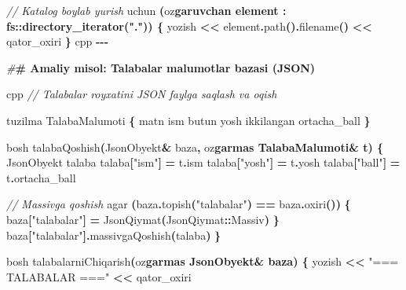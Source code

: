 \documentclass[a4paper,11pt,twoside,openright]{book}
\newenvironment{Shaded}{\begin{snugshade}}{\end{snugshade}}
\newcommand{\CharTok}[1]{\textcolor[rgb]{0.31,0.60,0.02}{#1}}
\newcommand{\CommentTok}[1]{\textcolor[rgb]{0.56,0.35,0.01}{\textit{#1}}}
\newcommand{\ErrorTok}[1]{\textcolor[rgb]{0.64,0.00,0.00}{\textbf{#1}}}
\newcommand{\NormalTok}[1]{#1}
\newcommand{\OperatorTok}[1]{\textcolor[rgb]{0.81,0.36,0.00}{\textbf{#1}}}
\newcommand{\PreprocessorTok}[1]{\textcolor[rgb]{0.56,0.35,0.01}{\textit{#1}}}
\newcommand{\StringTok}[1]{\textcolor[rgb]{0.31,0.60,0.02}{#1}}
\begin{document}
\begin{Shaded}
\begin{Highlighting}[]
\CommentTok{// Katalog bo\textquotesingle{}ylab yurish}
\NormalTok{uchun }\OperatorTok{(}\NormalTok{o}\CharTok{\textquotesingle{}z}\ErrorTok{garuvchan element : fs::directory\_iterator(".")) \{}
\NormalTok{    yozish }\OperatorTok{\textless{}\textless{}}\NormalTok{ element}\OperatorTok{.}\NormalTok{path}\OperatorTok{().}\NormalTok{filename}\OperatorTok{()} \OperatorTok{\textless{}\textless{}}\NormalTok{ qator\_oxiri}
\OperatorTok{\}}
\ErrorTok{\textasciigrave{}\textasciigrave{}\textasciigrave{}}\NormalTok{cpp}
\OperatorTok{{-}{-}{-}}

\PreprocessorTok{\#}\ErrorTok{\# Amaliy misol: Talabalar ma\textquotesingle{}lumotlar bazasi (JSON)}

\ErrorTok{\textasciigrave{}\textasciigrave{}\textasciigrave{}}\NormalTok{cpp}
\CommentTok{// Talabalar ro\textquotesingle{}yxatini JSON faylga saqlash va o\textquotesingle{}qish}

\NormalTok{tuzilma TalabaMalumoti }\OperatorTok{\{}
\NormalTok{    matn ism}
\NormalTok{    butun yosh}
\NormalTok{    ikkilangan ortacha\_ball}
\OperatorTok{\}}

\NormalTok{bosh talabaQoshish}\OperatorTok{(}\NormalTok{JsonObyekt}\OperatorTok{\&}\NormalTok{ baza}\OperatorTok{,}\NormalTok{ o}\CharTok{\textquotesingle{}z}\ErrorTok{garmas TalabaMalumoti\& t) \{}
\NormalTok{    JsonObyekt talaba}
\NormalTok{    talaba}\OperatorTok{[}\StringTok{"ism"}\OperatorTok{]} \OperatorTok{=}\NormalTok{ t}\OperatorTok{.}\NormalTok{ism}
\NormalTok{    talaba}\OperatorTok{[}\StringTok{"yosh"}\OperatorTok{]} \OperatorTok{=}\NormalTok{ t}\OperatorTok{.}\NormalTok{yosh}
\NormalTok{    talaba}\OperatorTok{[}\StringTok{"ball"}\OperatorTok{]} \OperatorTok{=}\NormalTok{ t}\OperatorTok{.}\NormalTok{ortacha\_ball}

    \CommentTok{// Massivga qo\textquotesingle{}shish}
\NormalTok{    agar }\OperatorTok{(}\NormalTok{baza}\OperatorTok{.}\NormalTok{topish}\OperatorTok{(}\StringTok{"talabalar"}\OperatorTok{)} \OperatorTok{==}\NormalTok{ baza}\OperatorTok{.}\NormalTok{oxiri}\OperatorTok{())} \OperatorTok{\{}
\NormalTok{        baza}\OperatorTok{[}\StringTok{"talabalar"}\OperatorTok{]} \OperatorTok{=}\NormalTok{ JsonQiymat}\OperatorTok{(}\NormalTok{JsonQiymat}\OperatorTok{::}\NormalTok{Massiv}\OperatorTok{)}
    \OperatorTok{\}}
\NormalTok{    baza}\OperatorTok{[}\StringTok{"talabalar"}\OperatorTok{].}\NormalTok{massivgaQoshish}\OperatorTok{(}\NormalTok{talaba}\OperatorTok{)}
\OperatorTok{\}}

\NormalTok{bosh talabalarniChiqarish}\OperatorTok{(}\NormalTok{o}\CharTok{\textquotesingle{}z}\ErrorTok{garmas JsonObyekt\& baza) \{}
\NormalTok{    yozish }\OperatorTok{\textless{}\textless{}} \StringTok{"=== TALABALAR ==="} \OperatorTok{\textless{}\textless{}}\NormalTok{ qator\_oxiri}


\end{Highlighting}
\end{Shaded}
\end{document}
